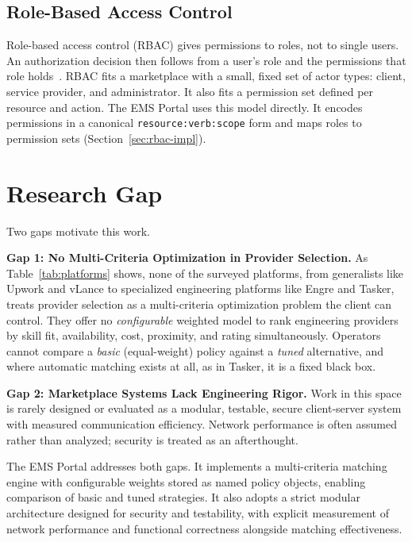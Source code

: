 \subsection{Role-Based Access Control}
Role-based access control (RBAC) gives permissions to roles, not to single
users. An authorization decision then follows from a user's role and the
permissions that role holds~\cite{sandhu1996role}. RBAC fits a marketplace with
a small, fixed set of actor types: client, service provider, and administrator.
It also fits a permission set defined per resource and action. The EMS Portal
uses this model directly. It encodes permissions in a canonical
\texttt{resource:verb:scope} form and maps roles to permission sets
(Section~\ref{sec:rbac-impl}).

\section{Research Gap}
Two gaps motivate this work.

\textbf{Gap 1: No Multi-Criteria Optimization in Provider Selection.}
As Table~\ref{tab:platforms} shows, none of the surveyed platforms, from
generalists like Upwork and vLance to specialized engineering platforms like
Engre and Tasker, treats provider selection as a multi-criteria optimization
problem the client can control. They offer no \textit{configurable} weighted
model to rank engineering providers by skill fit, availability, cost, proximity,
and rating simultaneously. Operators cannot compare a \textit{basic}
(equal-weight) policy against a \textit{tuned} alternative, and where automatic
matching exists at all, as in Tasker, it is a fixed black box.

\textbf{Gap 2: Marketplace Systems Lack Engineering Rigor.} Work in this space
is rarely designed or evaluated as a modular, testable, secure client-server
system with measured communication efficiency. Network performance is often
assumed rather than analyzed; security is treated as an afterthought.

The EMS Portal addresses both gaps. It implements a multi-criteria matching
engine with configurable weights stored as named policy objects, enabling
comparison of basic and tuned strategies. It also adopts a strict modular
architecture designed for security and testability, with explicit measurement of
network performance and functional correctness alongside matching effectiveness.
